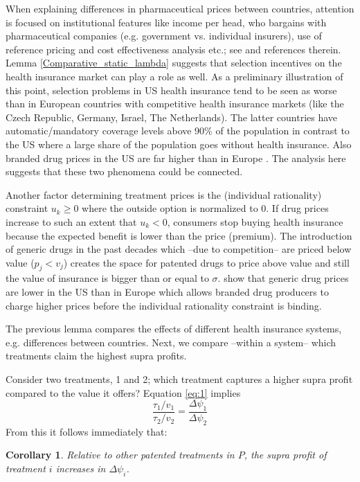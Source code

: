 \documentclass[a4paper,12pt]{article}
\newtheorem{corollary}{Corollary}
\begin{document}
When explaining differences in pharmaceutical prices between countries, attention is focused on institutional features like income per head, who bargains with pharmaceutical companies (e.g. government vs. individual insurers), use of reference pricing and cost effectiveness analysis etc.; see \cite{ScottMorton2011763} and references therein. Lemma \ref{Comparative_static_lambda} suggests that selection incentives on the health insurance market can play a role as well. As a preliminary illustration of this point, selection problems in US health insurance tend to be seen as worse than in European countries with competitive health insurance markets (like the Czech Republic, Germany, Israel, The Netherlands). The latter countries have automatic/mandatory coverage levels above 90\% of the population in contrast to the US where a large share of the population goes without health insurance. Also branded drug prices in the US are far higher than in Europe \citep{RR-2956-ASPEC}. The analysis here suggests that these two phenomena could be connected.

Another factor determining treatment prices is the (individual rationality) constraint \(u_k \geq 0\) where the outside option is normalized to 0. If drug prices increase to such an extent that \(u_k < 0\), consumers stop buying health insurance because the expected benefit is lower than the price (premium). The introduction of generic drugs in the past decades which --due to competition-- are priced below value (\(p_j < v_j\)) creates the space for patented drugs to price above value and still the value of insurance is bigger than or equal to \(\sigma\). \cite{RR-2956-ASPEC} show that generic drug prices are lower in the US than in Europe which allows branded drug producers to charge higher prices before the individual rationality constraint is binding.

The previous lemma compares the effects of different health insurance systems, e.g. differences between countries. Next, we compare --within a system-- which treatments claim the highest supra profits.

Consider two treatments, 1 and 2; which treatment captures a higher supra profit compared to the value it offers? Equation \eqref{eq:1} implies
\begin{equation}
\label{eq:42}
\frac{\tau_1/v_1}{\tau_2/v_2} = \frac{\Delta \psi_1}{\Delta \psi_2}
\end{equation}
From this it follows immediately that:

\begin{corollary}
\label{Effect_Delta_psi}
Relative to other patented treatments in \(P\), the supra profit of treatment \(i\) increases in \(\Delta \psi_i\).
\end{corollary}
\end{document}
